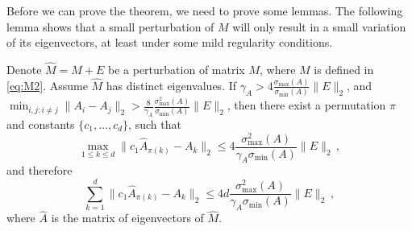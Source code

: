 Before we can prove the theorem, we need to prove some lemmas.
The following lemma shows that a small perturbation of $M$ will only result in a small variation of its eigenvectors, at least under some mild regularity conditions.
\begin{lemma}
\label{lem:eigenvectorvariation}
Denote $\hat{M} = M+E$ be a perturbation of matrix $M$, where $M$ is defined in  \eqref{eq:M2}. 
Assume $\hat{M}$ has distinct eigenvalues. 
If $\gamma_A > 4 \frac{\sigma_{\max}(A)}{\sigma_{\min}(A)}\|E\|_2$, and $\min_{i,j:i\neq j} \|A_i - A_j\|_2 > \frac{8}{\gamma_A}\frac{\sigma_{\max}^2(A)}{\sigma_{\min}(A) } \|E\|_2$, then there exist a permutation $\pi$ and constants $\{c_1,\ldots,c_d\}$, such that 
\[
\max_{1\le k\le d} \| c_1\hat{A}_{\pi(k)} - A_k\|_2 \le 4  \frac{\sigma_{\max}^2(A)}{\gamma_A \sigma_{\min}(A) } \|E\|_2\,,
\]
and therefore
\[
\sum_{k=1}^{d}\| c_1\hat{A}_{\pi(k)} - A_k\|_2 \le 4d  \frac{\sigma_{\max}^2(A)}{\gamma_A \sigma_{\min}(A)} \|E\|_2\,,
\]
where $\hat{A}$ is the matrix of eigenvectors of $\hat{M}$. 
\end{lemma}
